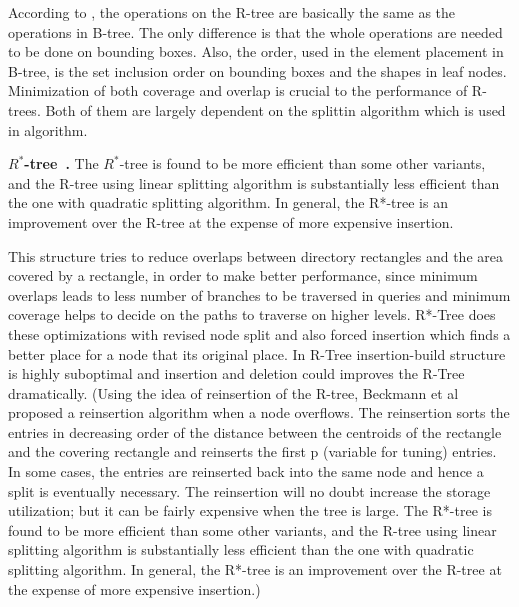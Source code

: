 \documentclass[a4paper,12pt]{article}
\begin{document}
According to \cite{survey}, the operations on the R-tree 
are basically the same as the operations in B-tree. The only difference is that the 
whole operations are needed to be done on bounding boxes.
Also, the order, used in the element placement in B-tree,
is the set inclusion order on bounding boxes and the shapes in leaf nodes. 
Minimization of both coverage and overlap is crucial to the performance of R-trees.
Both of them are largely dependent on the splittin algorithm which is used in algorithm.

\textbf{$R^*$-tree~\cite{rstartree}.}
The $R^*$-tree is found to be more efficient than some other variants,
and the R-tree using linear splitting algorithm is substantially less efficient than the one with quadratic splitting algorithm. In general, the R*-tree is an improvement over the R-tree at the expense of more expensive insertion.

This structure tries to reduce overlaps between directory rectangles and the area covered by a rectangle, in order to make better performance, since minimum overlaps leads to less number of branches to be traversed in queries and minimum coverage helps to decide on the paths to traverse on higher levels. 
R*-Tree does these optimizations with revised node split and also forced insertion which finds a better place for a node that its original place. In R-Tree insertion-build structure is highly suboptimal and insertion and deletion could improves the R-Tree dramatically.
 (Using the idea of reinsertion of the R-tree, Beckmann et al proposed a reinsertion algorithm when a node overflows. The reinsertion sorts the entries in decreasing order of the distance between the centroids of the rectangle and the covering rectangle and reinserts the first p (variable for tuning) entries. In some cases, the entries are reinserted back into the same node and hence a split is eventually necessary. The reinsertion will no doubt increase the storage utilization; but it can be fairly expensive when the tree is large. The R*-tree is found to be more efficient than some other variants, and the R-tree using linear splitting algorithm is substantially less efficient than the one with quadratic splitting algorithm. In general, the R*-tree is an improvement over the R-tree at the expense of more expensive insertion.)
\end{document}
